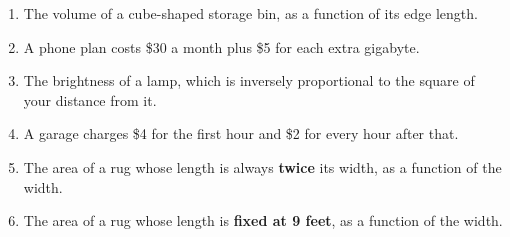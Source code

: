 \documentclass[10pt]{article}
\begin{document}
\begin{tcolorbox}[colback=white, colframe=black!40,
    title=\textbf{Tier R --- Remediate},
    fonttitle=\bfseries, arc=2mm, left=3mm, right=3mm, top=2mm, bottom=2mm]
\begin{enumerate}[itemsep=8pt]
        \begin{enumerate}[label=(\alph*), itemsep=4pt]
          \item The volume of a cube-shaped storage bin, as a function of its
                edge length. \blank{1.2cm}
          \item A phone plan costs \$30 a month plus \$5 for each extra
                gigabyte. \blank{1.2cm}
          \item The brightness of a lamp, which is inversely proportional to
                the square of your distance from it. \blank{1.2cm}
          \item A garage charges \$4 for the first hour and \$2 for every hour
                after that. \blank{1.2cm}
          \item The area of a rug whose length is always \textbf{twice} its
                width, as a function of the width. \blank{1.2cm}
          \item The area of a rug whose length is \textbf{fixed at 9 feet}, as
                a function of the width. \blank{1.2cm}
        \end{enumerate}
\end{enumerate}
\end{tcolorbox}

\vspace{0.1in}
\end{document}
